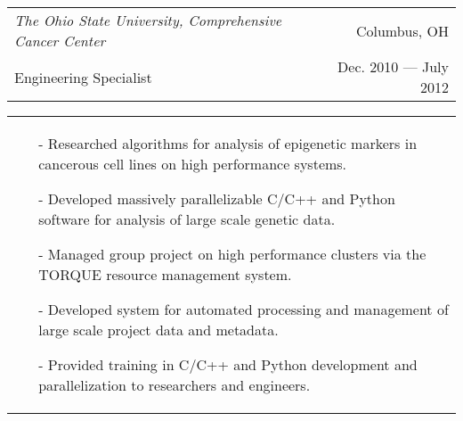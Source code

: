 \begin{tabularx}{\textwidth}{ L R }
  \textit{The Ohio State University, Comprehensive Cancer Center} & Columbus, OH \\
    \small{Engineering Specialist} & \small{Dec. 2010 --- July 2012} \\
\end{tabularx}
\begin{tabularx}{\textwidth}{ X }
  \begin{small}
  \begin{itemize}
    \itemsep{}
    \item[-] Researched algorithms for analysis of epigenetic markers in cancerous cell lines on high performance systems.
    \item[-] Developed massively parallelizable C/C++ and Python software for analysis of large scale genetic data.
    \item[-] Managed group project on high performance clusters via the TORQUE resource management system.
    \item[-] Developed system for automated processing and management of large scale project data and metadata.
    \item[-] Provided training in C/C++ and Python development and parallelization to researchers and engineers.
  \end{itemize}
  \end{small}
\end{tabularx}
